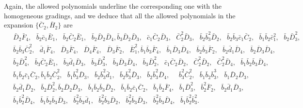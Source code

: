 \documentclass[10pt]{amsart}
\theoremstyle{definition}
\theoremstyle{corollary}
\theoremstyle{remark}
\theoremstyle{conclusion}
\begin{document}
Again, the allowed polynomials underline the corresponding one with the homogeneous gradings, and we deduce that all the allowed polynomials in the expansion $\{\bar{C}_2,\bar{H}_2\}$ are \begin{align*}
    & \, \bar{D}_2 \bar{F}_4,\text{ } \bar{b}_2 \bar{c}_1 \bar{E}_1,\text{ }\bar{b}_2 \bar{C}_2 \bar{E}_1,\text{ }\bar{b}_2 \bar{D}_2 \bar{D}_4,\bar{b}_3 \bar{D}_2 \bar{D}_3,\text{ }\bar{c}_1 \bar{C}_2 \bar{D}_3,\text{ }\bar{C}_2^2 \bar{D}_3,\text{ }\bar{b}_2 \bar{b}_3^2 \bar{D}_2,\text{ }\bar{b}_2 \bar{b}_3 \bar{c}_1 \bar{C}_2,\text{ }\bar{b}_1 \bar{b}_2 \bar{c}_1^2,  \text{ }\bar{b}_2 \bar{D}_3^2,\\
    & \, \bar{b}_2 \bar{b}_3 \bar{C}_2^2,\text{ }\bar{d}_1 \bar{F}_4,\text{ }\bar{D}_3 \bar{F}_4,\text{ }\bar{D}_4 \bar{F}_4,\text{ }\bar{D}_3 \bar{F}_2,\text{ }\bar{E}_1^2,\bar{b}_1 \bar{b}_3 \bar{F}_4,\text{ }\bar{b}_1 \bar{D}_3 \bar{D}_4,\text{ }\bar{b}_2 \bar{b}_3 \bar{F}_2,\text{ }\bar{b}_2 \bar{d}_1 \bar{D}_4,\text{ }\bar{b}_2 \bar{D}_3 \bar{D}_4, \\
    & \, \bar{b}_2 \bar{D}_4^2,\text{ }\bar{b}_3 \bar{C}_2 \bar{E}_1,\text{ }\bar{b}_3 \bar{d}_1 \bar{D}_3,\text{ }\bar{b}_3 \bar{D}_3^2, \text{ } \bar{b}_3 \bar{D}_3 \bar{D}_4,\text{ }\bar{b}_3 \bar{D}_2^2,\text{ }\bar{c}_1 \bar{C}_2 \bar{D}_2,\text{ }\bar{C}_2^2 \bar{D}_2,\text{ }\bar{C}_2^2 \bar{D}_4,\text{ }\bar{b}_1 \bar{b}_2 \bar{b}_3 \bar{D}_4, \\
    & \,  \bar{b}_1 \bar{b}_2 \bar{c}_1 \bar{C}_2,\bar{b}_1 \bar{b}_2 \bar{C}_2^2,\text{ }\bar{b}_1 \bar{b}_3^2 \bar{D}_3,\text{ }\bar{b}_2 \bar{b}_3^2 \bar{d}_1,\text{ }\bar{b}_2 \bar{b}_3^2 \bar{D}_3,\text{ }\bar{b}_2 \bar{b}_3^2 \bar{D}_4,\text{ }\text{ }\bar{b}_3^2 \bar{C}_2^2,\text{ }\bar{b}_1 \bar{b}_2 \bar{b}_3^3,\text{ }\bar{b}_1 \bar{D}_2 \bar{D}_3,\\
    & \, \bar{b}_2 \bar{d}_1 \bar{D}_2,\text{ }\bar{b}_2 \bar{D}_2^2,\bar{b}_2 \bar{D}_2 \bar{D}_3,\text{ }\bar{b}_1 \bar{b}_2 \bar{b}_3 \bar{D}_2,\text{ }\bar{b}_1 \bar{b}_2 \bar{c}_1 \bar{C}_2,\text{ }\bar{b}_1 \bar{b}_2 \bar{F}_4,\text{ }\bar{b}_1 \bar{D}_3^2,\text{ }\bar{b}_2^2 \bar{F}_2,\text{ }\bar{b}_2 \bar{d}_1 \bar{D}_3,\\
    & \, \bar{b}_1 \bar{b}_2^2 \bar{D}_4,\text{ }\bar{b}_1 \bar{b}_2 \bar{b}_3 \bar{D}_3,\text{ }\bar{b}_2^2 \bar{b}_3 \bar{d}_1,\text{ }\bar{b}_2^2 \bar{b}_3 \bar{D}_2,\text{ }\bar{b}_2^2 \bar{b}_3 \bar{D}_3,\text{ }\bar{b}_2^2 \bar{b}_3 \bar{D}_4,\text{ }\bar{b}_1 \bar{b}_2^2 \bar{b}_3^2.
\end{align*} 
\end{document}
